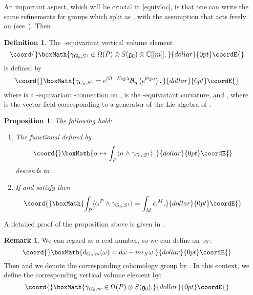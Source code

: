 \documentclass[a4paper,12pt,reqno,sumlimits]{amsart}
\theoremstyle{plain}
\newtheorem{prop}[thm]{Proposition}
\theoremstyle{definition}
\newtheorem{rem}[thm]{Remark}
\newtheorem{defn}[thm]{Definition}
\providecommand{\C}{{\mathbb C}}
\providecommand{\1}{{\bf 1}}
\providecommand{\g}{{\mathfrak  g}}
\providecommand{\uu}{{\mathfrak  u}}
\providecommand{\ex}[1]{{e^{#1}}}
\providecommand{\calB}{{\mathcal B}}
\providecommand{\calI}{{\mathcal I}}
\renewcommand{\to}{\longrightarrow}
\providecommand{\ip}[1]{\langle #1 \rangle}
\numberwithin{equation}{section}
\begin{document}
An important aspect, which will be crucial in \myHighlight{$\S$}\coordHE{}\ref{equivloc}, is
that one can write the same refinements for groups \coordHE{} which split as
\coordHE{}, with the assumption that \coordHE{} acts freely on \coordHE{}
(see~\cite[Sec 2.6]{radu}). Then \coordHE{}
\begin{defn}
  The \coordHE{}--equivariant vertical volume element
  $$\coord{}\boxMath{
  \gamma_{G_0,S^1}\in\Omega(P)\otimes S(\g_0)\otimes\C[[m]],
  }{dollar}{0pt}\coordE{}$$
  is defined by
  $$\coord{}\boxMath{
  \gamma_{G_0,S^1}=\ex{(\Omega-\calI)\otimes\lambda}
  \calB_\eta\left(\ex{\theta\otimes\eta}\right),
  }{dollar}{0pt}\coordE{}$$
  where \myHighlight{$\theta$}\coordHE{} is a \coordHE{}-equivariant \coordHE{}-connection on \coordHE{},
  \myHighlight{$\Omega_{S^1}=\Omega-\calI$}\coordHE{} is the \coordHE{}-equivariant curvature, and
  \myHighlight{$\calI=m\theta(X)$}\coordHE{}, where \coordHE{} is the vector field corresponding to a
  generator \coordHE{} of the Lie algebra \myHighlight{$\uu(1)$}\coordHE{} of \coordHE{}.
\end{defn}
\begin{prop}
  The following hold:
  \begin{enumerate}
  \item The functional \myHighlight{$\Omega_{G_0,S^1}(P)\to\C[[m]]$}\coordHE{} defined by
    $$\coord{}\boxMath{
    \alpha\mapsto\int_P\ip{\alpha\wedge\gamma_{G_0,S^1}},
    }{dollar}{0pt}\coordE{}$$
    descends to \coordHE{}.
  \item If \coordHE{} and \coordHE{}
    satisfy \coordHE{} then
    $$\coord{}\boxMath{
    \int_P\ip{\alpha^P\wedge\gamma_{G_0,S^1}}=\int_M\alpha^M.
    }{dollar}{0pt}\coordE{}$$
  \end{enumerate}
\end{prop}
A detailed proof of the proposition above is given in~\cite[p. 38-39]{radu}.
\begin{rem}
  \label{mreal}
  We can regard \myHighlight{$m\in\uu(1)^*$}\coordHE{} as a real number, so we can define \coordHE{}
  on \coordHE{} by:
  $$\coord{}\boxMath{
  d_{G_0,m}(\omega)=d\omega-m\iota_X\omega.
  }{dollar}{0pt}\coordE{}$$
  Then \coordHE{} and we denote the corresponding cohomology group
  by \coordHE{}. In this context, we define the corresponding vertical
  volume element by:
  $$\coord{}\boxMath{
  \gamma_{G_0,m}\in\Omega(P)\otimes S(\g_0).
  }{dollar}{0pt}\coordE{}$$
\end{rem}
\end{document}
